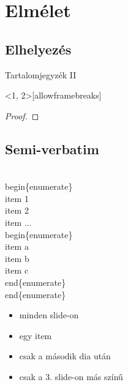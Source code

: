 \documentclass[aspectratio=169,12pt]{beamer}
\begin{document}
\section{Elmélet}
\subsection{Elhelyezés}
\begin{frame}
	\sectionpage
\end{frame}
\begin{frame}[plain]{Tartalomjegyzék II}
	\tableofcontents[currentsection]
\end{frame}

\begin{frame}<1, 2>[allowframebreaks]
	\begin{theorem}
		\hulipsum[2]
	\end{theorem}
	
		
	\begin{proof}
		\hulipsum[5]
	\end{proof}
\end{frame}


\subsection{Semi-verbatim}
\begin{semiverbatim}
	\\begin\{\alert{enumerate}\}
	\\item 1
	\\item 2
	\\item ...
		\color{green}\\begin\{\alert{enumerate}\}
			\\item a
			\\item b
			\\item c
		\\end\{enumerate\}
	\color{black}\\end\{enumerate\}
\end{semiverbatim}

\begin{frame}
	\begin{itemize}
		\item minden slide-on
		\item<1> egy item
		\item<2-> csak a második dia után
		\item\alert<3>{csak a 3. slide-on más színű}
	\end{itemize}
\end{frame}
\end{document}
